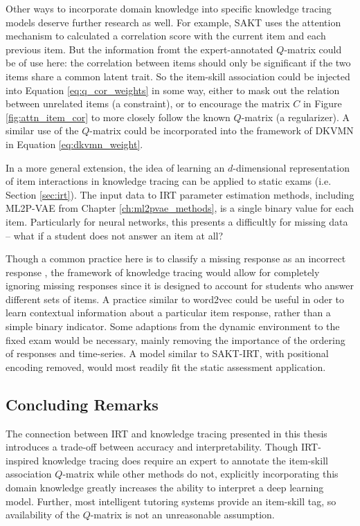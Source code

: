 Other ways to incorporate domain knowledge into specific knowledge tracing models deserve further research as well. For example, SAKT uses the attention mechanism to calculated a correlation score with the current item and each previous item. But the information fromt the expert-annotated $Q$-matrix could be of use here: the correlation between items should only be significant if the two items share a common latent trait. So the item-skill association could be injected into Equation \ref{eq:q_cor_weights} in some way, either to mask out the relation between unrelated items (a constraint), or to encourage the matrix $C$ in Figure \ref{fig:attn_item_cor} to more closely follow the known $Q$-matrix (a regularizer). A similar use of the $Q$-matrix could be incorporated into the framework of DKVMN in Equation \ref{eq:dkvmn_weight}.

In a more general extension, the idea of learning an $d$-dimensional representation of item interactions in knowledge tracing can be applied to static exams (i.e. Section \ref{sec:irt}). The input data to IRT parameter estimation methods, including ML2P-VAE from Chapter \ref{ch:ml2pvae_methods}, is a single binary value for each item. Particularly for neural networks, this presents a difficultly for missing data -- what if a student does not answer an item at all?

Though a common practice here is to classify a missing response as an incorrect response \cite{thissen}, the framework of knowledge tracing would allow for completely ignoring missing responses since it is designed to account for students who answer different sets of items. A practice similar to word2vec \cite{mikolov2013} could be useful in oder to learn contextual information about a particular item response, rather than a simple binary indicator. Some adaptions from the dynamic environment to the fixed exam would be necessary, mainly removing the importance of the ordering of responses and time-series. A model similar to SAKT-IRT, with positional encoding removed, would most readily fit the static assessment application.

\subsection{Concluding Remarks}
The connection between IRT and knowledge tracing presented in this thesis introduces a trade-off between accuracy and interpretability. Though IRT-inspired knowledge tracing does require an expert to annotate the item-skill association $Q$-matrix while other methods do not, explicitly incorporating this domain knowledge greatly increases the ability to interpret a deep learning model. Further, most intelligent tutoring systems provide an item-skill tag, so availability of the $Q$-matrix is not an unreasonable assumption.

